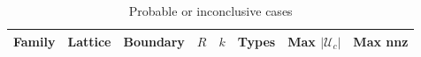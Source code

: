 \begin{table}
\centering
\begin{tabular}{llllrrrr}
Family & Lattice & Boundary & $R$ & $k$ & Types & Max $|\mathcal U_c|$ & Max nnz \\
\hline
\end{tabular}
\caption{Probable or inconclusive cases}
\end{table}
